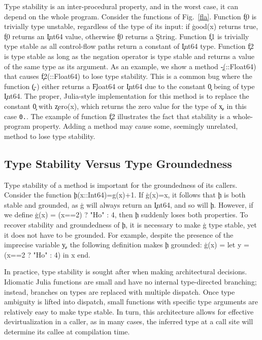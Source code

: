 Type stability is an inter-procedural property, and in the worst case, it can depend
on the whole program. Consider the functions of Fig.~\ref{fla}. Function \c{f0}
is trivially type unstable, regardless of the type of its input: if \c{good(x)}
returns true, \c{f0} returns an \c{Int64} value, otherwise \c{f0} returns a
\c{String}. Function \c{f1} is trivially type stable as all control-flow paths
return a constant of \c{Int64} type. Function \c{f2} is type stable as
long as the negation operator is type stable and returns a value of the same type
as its argument. As an example, we show a method \c{-(::Float64)} that causes
\c{f2(::Float64)} to lose type stability. This is a common bug where the function
\c{(-)} either returns a \c{Float64} or \c{Int64} due to the constant \c{0} being
of type \c{Int64}.  The proper, Julia-style implementation for this method is
to replace the constant \c{0} with \c{zero(x)}, which returns the zero value
for the type of \c{x}, in this case \texttt{\small0\!.}.
The example of function \c{f2} illustrates the fact that stability is a
whole-program property. Adding a method may cause some, seemingly unrelated,
method to lose type stability.

\subsection{Type Stability Versus Type Groundedness}

Type stability of a method is important for the groundedness of its callers.
Consider the function \c{h(x::Int64)=g(x)+1}. If \c{g(x)=x}, it follows that
\c{h} is both stable and grounded, as \c{g} will always return an \c{Int64}, and
so will \c{h}. However, if we define \c{g(x) = (x==2) ? "Ho" : 4}, then \c{h}
suddenly loses both properties. To recover stability and groundedness of \c{h},
it is necessary to make \c{g} type stable, yet it does not have to be grounded.
For example, despite the presence of the imprecise variable \c{y}, the following
definition makes \c{h} grounded: \c{g(x) = let y = (x==2 ? "Ho" : 4) in x
end}.

In practice, type stability is sought after when making architectural decisions.
Idiomatic Julia functions are small and have no internal type-directed
branching; instead, branches on types are replaced with multiple dispatch.
Once type ambiguity is lifted into dispatch, small functions with specific
type arguments are relatively easy to make type stable. In turn, this
architecture allows for effective devirtualization in a caller, as in many cases, the
inferred type at a call site will determine its callee at compilation time.

